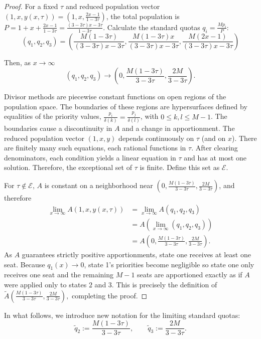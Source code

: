 \documentclass[11pt]{article}
\theoremstyle{definition}
\theoremstyle{definition}
\begin{document}
\begin{proof}
For a fixed $\tau$ and reduced population vector $(1,x,y(x,\tau))=\left( 1,x,\frac{2x-1}{1-3\tau} \right)$, the total population is $P = 1 + x + \frac{2x-1}{1-3\tau} = \frac{(3-3\tau)x - 3\tau}{1-3\tau}.$ Calculate the standard quotas $q_i = \frac{Mp_i}{P}$:
$$(q_1, q_2, q_3) = \left( \frac{M(1-3\tau)}{(3-3\tau)x-3\tau} , \frac{M(1-3\tau)x}{(3-3\tau)x-3\tau} , \frac{M(2x-1)}{(3-3\tau)x-3\tau} \right)$$


\noindent Then, as $x \to \infty$
$$ (q_1, q_2, q_3) \to\left( 0 , \frac{M(1-3\tau)}{3-3\tau} , \frac{2M}{3-3\tau} \right). $$

Divisor methods are piecewise constant functions on open regions of the population space. The boundaries of these regions are hypersurfaces defined by equalities of the priority values, $\frac{p_i}{\delta(k)} = \frac{p_j}{\delta(l)}$, with $0 \leq k,l \leq M-1$. The boundaries cause a discontinuity in $A$ and a change in apportionment. The reduced population vector $(1,x,y)$ depends continuously on $\tau$ (and on $x$). 
There are finitely many such equations, each rational functions in $\tau$. After clearing denominators, each condition yields a linear equation in $\tau$ and has at most one solution. Therefore, the exceptional set of $\tau$ is finite. Define this set as $\mathcal{E}$.

For $\tau \not \in \mathcal{E}$, $A$ is constant on a neighborhood near $\left( 0 , \frac{M(1-3\tau)}{3-3\tau} , \frac{2M}{3-3\tau} \right)$, and therefore
$$
\begin{array}{cl}
\displaystyle\lim_{x \to \infty}A(1, x,y(x,\tau)) & = \displaystyle\lim_{x \to \infty}A(q_1, q_2,q_3) \\ [9pt]
 & =A(\displaystyle\lim_{x \to \infty}(q_1, q_2,q_3)) \\ [9pt]
 & =A \left( 0 , \frac{M(1-3\tau)}{3-3\tau}, \frac{2M}{3-3\tau} \right).
\end{array}
$$
As $A$ guarantees strictly positive apportionments, state one receives at least one seat. Because $q_1(x)\to 0$, state 1's priorities become negligible so state one only receives one seat and the remaining $M-1$ seats are apportioned exactly as if $A$ were applied only to states $2$ and $3$. This is precisely the definition of $\tilde{A} \left( \frac{M(1-3\tau)}{3-3\tau},\frac{2M}{3-3\tau}\right),$ completing the proof.
\end{proof}

In what follows, we introduce new notation for the limiting standard quotas: 
$$
\tilde{q}_2 :=\frac{M(1-3\tau)}{3-3\tau}, \qquad 
\tilde{q}_3 :=\frac{2M}{3-3\tau}.
$$
\end{document}
